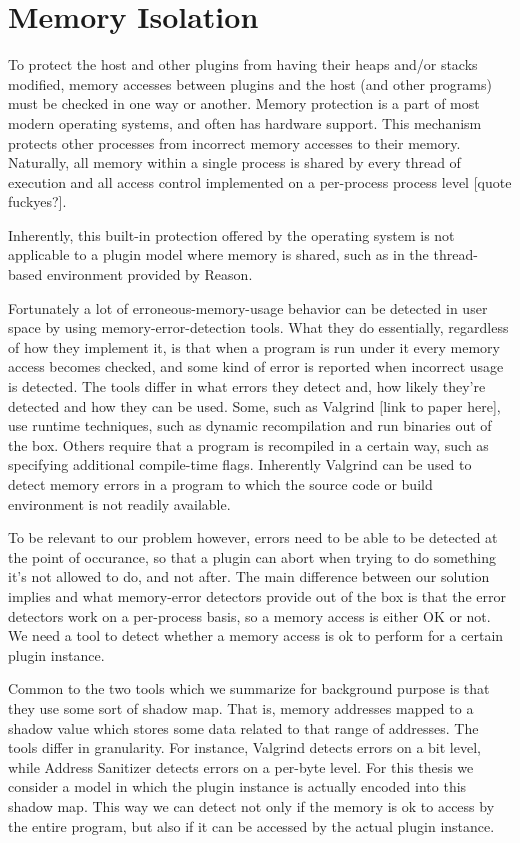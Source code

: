 \chapter {Memory Isolation}

To protect the host and other plugins from having their heaps and/or stacks
modified, memory accesses between plugins and the host (and other programs) must
be checked in one way or another. Memory protection is a part of most modern
operating systems, and often has hardware support. This mechanism protects other
processes from incorrect memory accesses to their memory. Naturally, all memory
within a single process is shared by every thread of execution and all access
control implemented on a per-process process level [quote fuckyes?].
 
Inherently, this built-in protection offered by the operating system is not
applicable to a plugin model where memory is shared, such as in the thread-based
environment provided by Reason.

Fortunately a lot of erroneous-memory-usage behavior can be detected in user
space by using memory-error-detection tools. What they do essentially,
regardless of how they implement it, is that when a program is run under it
every memory access becomes checked, and some kind of error is reported when
incorrect usage is detected. The tools differ in what errors they detect and,
how likely they're detected and how they can be used. Some, such as Valgrind
[link to paper here], use runtime techniques, such as dynamic recompilation and
run binaries out of the box. Others require that a program is recompiled in a
certain way, such as specifying additional compile-time flags. Inherently
Valgrind can be used to detect memory errors in a program to which the source
code or build environment is not readily available.

To be relevant to our problem however, errors need to be able to be detected at
the point of occurance, so that a plugin can abort when trying to do something
it's not allowed to do, and not after. The main difference between our solution
implies and what memory-error detectors provide out of the box is that the
error detectors work on a per-process basis, so a memory access is either OK or
not. We need a tool to detect whether a memory access is ok to perform for a
certain plugin instance.

Common to the two tools which we summarize for background purpose is that they
use some sort of shadow map. That is, memory addresses mapped to a shadow value
which stores some data related to that range of addresses. The tools differ in
granularity. For instance, Valgrind detects errors on a bit level, while
Address Sanitizer detects errors on a per-byte level. For this thesis we
consider a model in which the plugin instance is actually encoded into this
shadow map. This way we can detect not only if the memory is ok to access by the
entire program, but also if it can be accessed by the actual plugin instance.

